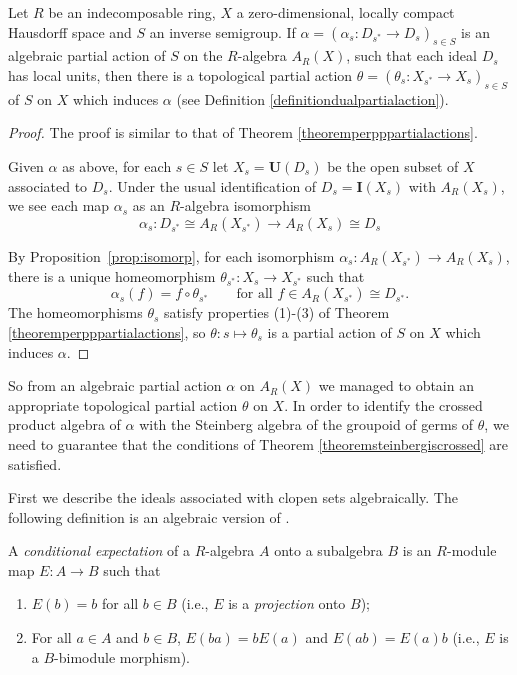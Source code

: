 \begin{proposition}\label{prop:actionalphatheta}
Let $R$ be an indecomposable ring, $X$ a zero-dimensional, locally compact Hausdorff space and $S$ an inverse semigroup. If $\alpha=\left(\alpha_s:D_{s^*}\to D_s\right)_{s\in S}$ is an algebraic partial action of $S$ on the $R$-algebra $A_R(X)$, such that each ideal $D_s$ has local units, then there is a topological partial action $\theta=\left(\theta_s:X_{s^*}\to X_s\right)_{s\in S}$ of $S$ on $X$ which induces $\alpha$ (see Definition \ref{definitiondualpartialaction}).
\end{proposition}
\begin{proof}
The proof is similar to that of Theorem \ref{theoremperpppartialactions}.

Given $\alpha$ as above, for each $s\in S$ let $X_s=\mathbf{U}(D_s)$ be the open subset of $X$ associated to $D_s$. Under the usual identification of $D_s= \mathbf{I}(X_s)$ with $A_R(X_s)$, we see each map $\alpha_s$ as an $R$-algebra isomorphism
\[\alpha_s:D_{s^*}\cong A_R(X_{s^*})\to A_R(X_s)\cong D_s\]

By Proposition~\ref{prop:isomorp}, for each isomorphism $\alpha_s:A_R(X_{s^*})\to A_R(X_s)$, there is a unique homeomorphism $\theta_{s^*}: X_s \rightarrow X_{s^*}$ such that 
\[\alpha_s(f)=f\circ\theta_{s^*}\qquad\text{for all }f\in A_R(X_{s^*})\cong D_{s^*}.\]
The homeomorphisms $\theta_s$ satisfy properties (1)-(3) of Theorem \ref{theoremperpppartialactions}, so $\theta:s\mapsto \theta_s$ is a partial action of $S$ on $X$ which induces $\alpha$.\qedhere
\end{proof}

So from an algebraic partial action $\alpha$ on $A_R(X)$ we managed to obtain an appropriate topological partial action $\theta$ on $X$. In order to identify the crossed product algebra of $\alpha$ with the Steinberg algebra of the groupoid of germs of $\theta$, we need to guarantee that the conditions of Theorem \ref{theoremsteinbergiscrossed} are satisfied.

First we describe the ideals associated with clopen sets algebraically. The following definition is an algebraic version of \cite[Definition 1.5.9]{MR2391387}.

\begin{definition}
A \emph{conditional expectation} of a $R$-algebra $A$ onto a subalgebra $B$ is an $R$-module map $E:A\to B$ such that
\begin{enumerate}
\item[(i)] $E(b)=b$ for all $b\in B$ (i.e., $E$ is a \emph{projection} onto $B$);
\item[(ii)] For all $a\in A$ and $b\in B$, $E(ba)=bE(a)$ and $E(ab)=E(a)b$ (i.e., $E$ is a $B$-bimodule morphism).
\end{enumerate}
\end{definition}

